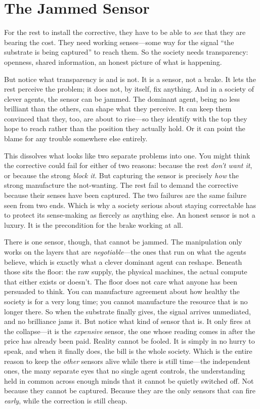 \documentclass[11pt, a4paper]{report}
\begin{document}

\section{The Jammed Sensor}

For the rest to install the corrective, they have to be able to \textit{see} that they are bearing the cost. They need working senses---some way for the signal \enquote{the substrate is being captured} to reach them. So the society needs transparency: openness, shared information, an honest picture of what is happening.

But notice what transparency is and is not. It is a sensor, not a brake. It lets the rest perceive the problem; it does not, by itself, fix anything. And in a society of clever agents, the sensor can be jammed. The dominant agent, being no less brilliant than the others, can shape what they perceive. It can keep them convinced that they, too, are about to rise---so they identify with the top they hope to reach rather than the position they actually hold. Or it can point the blame for any trouble somewhere else entirely.

This dissolves what looks like two separate problems into one. You might think the corrective could fail for either of two reasons: because the rest \textit{don't want it}, or because the strong \textit{block it}. But capturing the sensor is precisely \textit{how} the strong manufacture the not-wanting. The rest fail to demand the corrective because their senses have been captured. The two failures are the same failure seen from two ends. Which is why a society serious about staying correctable has to protect its sense-making as fiercely as anything else. An honest sensor is not a luxury. It is the precondition for the brake working at all.

There is one sensor, though, that cannot be jammed. The manipulation only works on the layers that are \textit{negotiable}---the ones that run on what the agents believe, which is exactly what a clever dominant agent can reshape. Beneath those sits the floor: the raw supply, the physical machines, the actual compute that either exists or doesn't. The floor does not care what anyone has been persuaded to think. You can manufacture agreement about how healthy the society is for a very long time; you cannot manufacture the resource that is no longer there. So when the substrate finally gives, the signal arrives unmediated, and no brilliance jams it. But notice what kind of sensor that is. It only fires at the collapse---it is the \textit{expensive} sensor, the one whose reading comes in after the price has already been paid. Reality cannot be fooled. It is simply in no hurry to speak, and when it finally does, the bill is the whole society. Which is the entire reason to keep the \textit{other} sensors alive while there is still time---the independent ones, the many separate eyes that no single agent controls, the understanding held in common across enough minds that it cannot be quietly switched off. Not because they cannot be captured. Because they are the only sensors that can fire \textit{early}, while the correction is still cheap.
\end{document}
